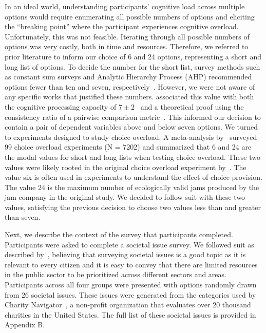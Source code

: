 In an ideal world, understanding participants' cognitive load across multiple options would require enumerating all possible numbers of options and eliciting the ``breaking point'' where the participant experiences cognitive overload. Unfortunately, this was not feasible. Iterating through all possible numbers of options was very costly, both in time and resources. Therefore, we referred to prior literature to inform our choice of 6 and 24 options, representing a short and long list of options. To decide the number for the short list, survey methods such as constant sum surveys and Analytic Hierarchy Process (AHP) recommended options fewer than ten and seven, respectively~\cite{moroneyQuestionnaireDesignHow2019, saatyGroupDecisionMaking2013, saatyPrinciplesAnalyticHierarchy1987}. However, we were not aware of any specific works that justified these numbers. \textcite{saatyPrinciplesAnalyticHierarchy1987} associated this value with both the cognitive processing capacity of $7\pm2$~\cite{millerMagicalNumberSeven1956} and a theoretical proof using the consistency ratio of a pairwise comparison metric~\cite{saaty2003magic}. This informed our decision to contain a pair of dependent variables above and below seven options. We turned to experiments designed to study choice overload. A meta-analysis by~\textcite{chernevChoiceOverloadConceptual2015} surveyed 99 choice overload experiments (N = 7202) and summarized that 6 and 24 are the modal values for short and long lists when testing choice overload. These two values were likely rooted in the original choice overload experiment by~\textcite{iyengarWhenChoiceDemotivating2000}. The value six is often used in experiments to understand the effect of choice provision. The value 24 is the maximum number of ecologically valid jams produced by the jam company in the original study. We decided to follow suit with these two values, satisfying the previous decision to choose two values less than and greater than seven.

Next, we describe the context of the survey that participants completed. Participants were asked to complete a societal issue survey. We followed suit as described by~\textcite{chengCanShowWhat2021}, believing that surveying societal issues is a good topic as it is relevant to every citizen and it is easy to convey that there are limited resources in the public sector to be prioritized across different sectors and areas. Participants across all four groups were presented with options randomly drawn from 26 societal issues. These issues were generated from the categories used by Charity Navigator~\cite{CharityNavigatorAnimals2023}, a non-profit organization that evaluates over 20 thousand charities in the United States. The full list of these societal issues is provided in Appendix B.

